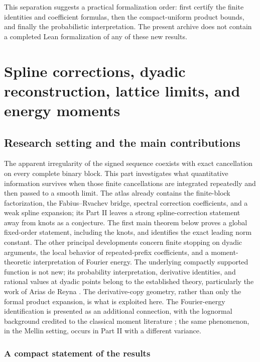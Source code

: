 \documentclass[11pt,a4paper,oneside,openany]{book}
\numberwithin{equation}{chapter}
\theoremstyle{definition}
\theoremstyle{remark}
\begin{document}
This separation suggests a practical formalization order: first certify the finite identities and coefficient formulas, then the compact-uniform product bounds, and finally the probabilistic interpretation. The present archive does not contain a completed Lean formalization of any of these new results.

\part{Spline corrections, dyadic reconstruction, lattice limits, and energy moments}
\label{part:splines}

\chapter{Research setting and the main contributions}
\label{rs:sec:intro}
The apparent irregularity of the signed sequence coexists with exact
cancellation on every complete binary block. This part investigates what
quantitative information survives when those finite cancellations are
integrated repeatedly and then passed to a smooth limit. The atlas already
contains the finite-block factorization, the Fabius--Rvachev bridge,
spectral correction coefficients, and a weak spline expansion; its Part II
leaves a strong spline-correction statement away from knots as a
conjecture. The first main theorem below proves a global fixed-order
statement, including the knots, and identifies the exact leading norm
constant. The other principal developments concern finite stopping on
dyadic arguments, the local behavior of repeated-prefix coefficients, and a
moment-theoretic interpretation of Fourier energy. The underlying compactly
supported function is not new; its probability interpretation, derivative
identities, and rational values at dyadic points belong to the established
theory, particularly the work of Arias de Reyna \cite{arias1982,arias2018}.
The derivative-copy geometry, rather than only the formal product
expansion, is what is exploited here. The Fourier-energy identification is
presented as an additional connection, with the lognormal background
credited to the classical moment literature \cite{heyde}; the same
phenomenon, in the Mellin setting, occurs in Part II with a different
variance.


\section{A compact statement of the results}
\end{document}
